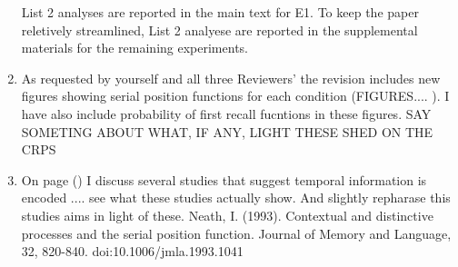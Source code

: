 \documentclass[12pt]{article}
\begin{document}
\begin{enumerate}
	List 2 analyses are reported in the main text for E1. To keep the paper reletively streamlined, List 2 analyese are reported in the supplemental materials for the remaining experiments.


\item
	As requested by yourself and all three Reviewers' the revision includes new figures showing serial position functions for each condition (FIGURES.... \pageref{TODO-7}). I have also include probability of first recall fucntions in these figures. SAY SOMETING ABOUT WHAT, IF ANY, LIGHT THESE SHED ON THE CRPS

\item
	On page (\pageref{TODO-8}) I discuss several studies that suggest temporal information is encoded .... see what these studies actually show. And slightly repharase this studies aims in light of these.
	Neath, I. (1993). Contextual and distinctive processes and the serial position function. Journal of Memory and Language, 32, 820-840. doi:10.1006/jmla.1993.1041


\end{enumerate}
\end{document}
